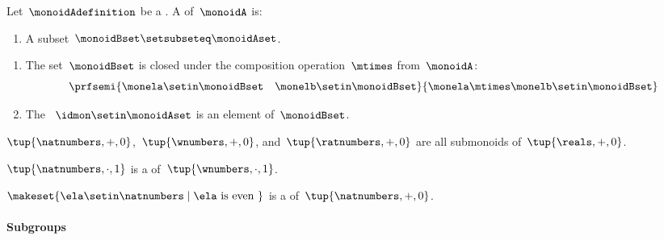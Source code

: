 \begin{definition}[Submonoids]\label{def:submonoids}
    Let~$\monoidAdefinition$ be a .
    A  of~$\monoidA$ is:

    \constit

    \begin{enumerate}
        \item A subset~$\monoidBset \setsubseteq \monoidAset$.
    \end{enumerate}

    \condit

    \begin{enumerate}
        \item The set~$\monoidBset$ is closed under the composition operation~$\mtimes$ from~$\monoidA$:
              \begin{equation}
                  \prfsemi{\monela \setin \monoidBset \quad \monelb \setin \monoidBset}{\monela \mtimes \monelb \setin \monoidBset}
              \end{equation}

        \item The ~$\idmon \setin \monoidAset$ is an element of~$\monoidBset$.
    \end{enumerate}
\end{definition}

\begin{example}
    $\tup{\natnumbers, +, 0}$,~$\tup{\wnumbers, +, 0}$, and~$\tup{\ratnumbers, +, 0}$ are all submonoids of~$\tup{\reals, +, 0}$.
\end{example}

\begin{example}
    $\tup{\natnumbers, \cdot, 1}$  is a  of~$\tup{\wnumbers, \cdot, 1}$.
\end{example}

\begin{example}
    $\makeset{ \ela \setin \natnumbers \mid \ela \text{ is even } }$ is a  of~$\tup{\natnumbers, +, 0}$.
\end{example}



\paragraph{Subgroups}


